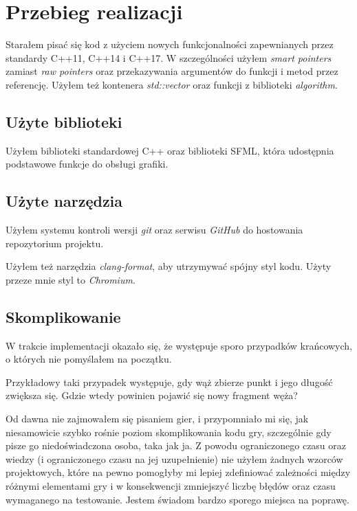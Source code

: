 \documentclass[12pt]{article}
\begin{document}
\section{Przebieg realizacji}


Starałem pisać się kod z użyciem nowych funkcjonalności zapewnianych przez
standardy C++11, C++14 i C++17. W szczególności użyłem \textit{smart pointers}
zamiast \textit{raw pointers} oraz przekazywania argumentów do funkcji i metod
przez referencję. Użyłem też kontenera \textit{std::vector} oraz funkcji z
biblioteki \textit{algorithm}.

\subsection{Użyte biblioteki}

Użyłem biblioteki standardowej C++ oraz biblioteki SFML, która udostępnia
podstawowe funkcje do obsługi grafiki.

\subsection{Użyte narzędzia}

Użyłem systemu kontroli wersji \textit{git} oraz serwisu \textit{GitHub} do
hostowania repozytorium projektu.

Użyłem też narzędzia \textit{clang-format}, aby utrzymywać spójny styl kodu.
Użyty przeze mnie styl to \textit{Chromium}.

\subsection{Skomplikowanie}
W trakcie implementacji okazało się, że występuje sporo przypadków krańcowych, o
których nie pomyślałem na początku.

Przykładowy taki przypadek występuje, gdy wąż zbierze punkt i jego długość
zwiększa się. Gdzie wtedy powinien pojawić się nowy fragment węża?

Od dawna nie zajmowałem się pisaniem gier, i przypomniało mi się, jak
niesamowicie szybko rośnie poziom skomplikowania kodu gry, szczególnie gdy pisze
go niedoświadczona osoba, taka jak ja. Z powodu ograniczonego czasu oraz wiedzy
(i ograniczonego czasu na jej uzupełnienie) nie użyłem żadnych wzorców
projektowych, które na pewno pomogłyby mi lepiej zdefiniować zależności między
różnymi elementami gry i w konsekwencji zmniejszyć liczbę błędów oraz czasu
wymaganego na testowanie. Jestem świadom bardzo sporego miejsca na poprawę.
\end{document}

